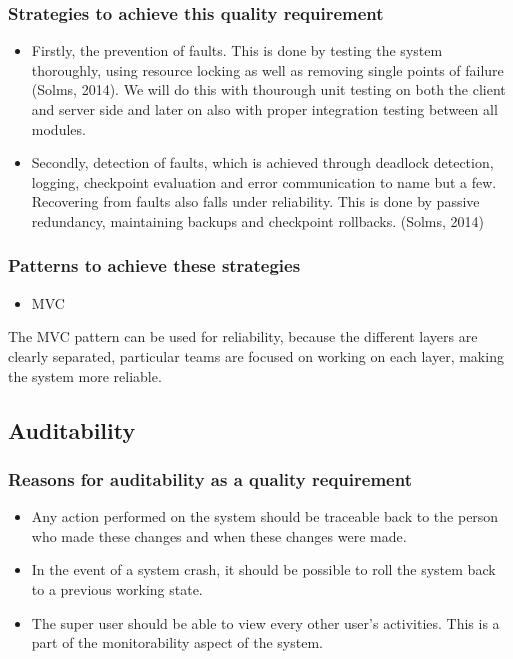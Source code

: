 \documentclass[a4paper,12pt]{article}
\begin{document}
\subsubsection{Strategies to achieve this quality requirement}
\begin{itemize}
\item Firstly, the prevention of faults. This is done by testing the system thoroughly, using resource locking as well as removing single points of failure (Solms, 2014). We will do this with thourough unit testing on both the client and server side and later on also with proper integration testing between all modules. 
 \item Secondly, detection of faults, which is achieved through deadlock detection, logging, checkpoint evaluation and error communication to name but a few. Recovering from faults also falls under reliability. This is done by passive redundancy, maintaining backups and checkpoint rollbacks. (Solms, 2014)
 \end{itemize}

 \subsubsection{Patterns to achieve these strategies}
 \begin{itemize}
 \item MVC
 \end{itemize}
 The MVC pattern can  be used for reliability, because the different layers are clearly separated, particular teams are focused on working on each layer, making the system more reliable. 

 \subsection{Auditability}

 \subsubsection{Reasons for auditability as a quality requirement}
 \begin{itemize}
 \item Any action performed on the system should be traceable back to the person who made these changes and when these changes were made.
 \item In the event of a system crash, it should be possible to roll the system back to a previous working state.
 \item The super user should be able to view every other user's activities. This is a part of the monitorability aspect of the system.
 \end{itemize}
\end{document}
